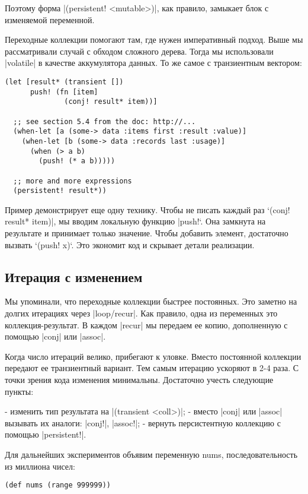 Поэтому форма \spverb|(persistent! <mutable>)|, как правило, замыкает блок с изменяемой
переменной.

Переходные коллекции помогают там, где нужен императивный подход. Выше мы
рассматривали случай с обходом сложного дерева. Тогда мы использовали \spverb|volatile|
в качестве аккумулятора данных. То же самое с транзиентным вектором:

\begin{verbatim}
(let [result* (transient [])
      push! (fn [item]
              (conj! result* item))]

  ;; see section 5.4 from the doc: http://...
  (when-let [a (some-> data :items first :result :value)]
    (when-let [b (some-> data :records last :usage)]
      (when (> a b)
        (push! (* a b)))))

  ;; more and more expressions
  (persistent! result*))
\end{verbatim}

Пример демонстрирует еще одну технику. Чтобы не писать каждый раз `(conj!
result* item)\spverb|, мы вводим локальную функцию |push!`. Она замкнута на результате
и принимает только значение. Чтобы добавить элемент, достаточно вызвать `(push!
x)`. Это экономит код и скрывает детали реализации.

\subsection{Итерация с изменением}

Мы упоминали, что переходные коллекции быстрее постоянных. Это заметно на долгих
итерациях через \spverb|loop/recur|. Как правило, одна из переменных это
коллекция-результат. В каждом \spverb|recur| мы передаем ее копию, дополненную с
помощью \spverb|conj| или \spverb|assoc|.

Когда число итераций велико, прибегают к уловке. Вместо постоянной коллекции
передают ее транзиентный вариант. Тем самым итерацию ускоряют в 2-4 раза. С
точки зрения кода изменения минимальны. Достаточно учесть следующие пункты:

- изменить тип результата на \spverb|(transient <coll>)|;
- вместо \spverb|conj| или \spverb|assoc| вызывать их аналоги: \spverb|conj!|, \spverb|assoc!|;
- вернуть персистентную коллекцию с помощью \spverb|persistent!|.

Для дальнейших экспериментов объявим переменную nums, последовательность из
миллиона чисел:

\begin{verbatim}
(def nums (range 999999))
\end{verbatim}

